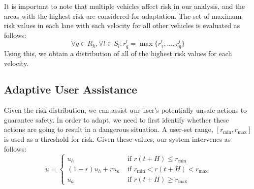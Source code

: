 \documentclass[letterpaper, 10 pt, conference]{ieeeconf}  %
\newcommand\NB[1]{$\spadesuit$\footnote{NB: #1}}
\newcommand\RP[1]{$\clubsuit$\footnote{RP: #1}}
\begin{document}
It is important to note that multiple vehicles affect risk in our analysis, and the areas with the highest risk are considered for adaptation. The set of maximum risk values in each lane with each velocity for all other vehicles is evaluated as follows: %
\begin{equation}
    \forall q\in R_h,\forall{l}\in{S_l}: r_{q}^l = \max\{r^l_{1},\ldots,r^l_{q}\}
\end{equation}
Using this, we obtain a distribution of all of the highest risk values for each velocity.


\subsection{Adaptive User Assistance}

Given the risk distribution, we can assist our user's potentially unsafe actions to guarantee safety. In order to adapt, we need to first identify whether these actions are going to result in a dangerous situation. A user-set range, $[r_\min,r_\max]$ is used as a threshold for risk. Given these values, our system intervenes as follows:
\begin{equation}
    u = \begin{cases}
    u_h & \text{ if } r(t+H)\leq r_\min \\
    (1-r)u_h + r u_a & \text { if } r_\min<r(t+H)<r_\max \\
    u_a & \text{ if } r(t+H)\geq r_\max
    \end{cases}
\end{equation}
\end{document}
